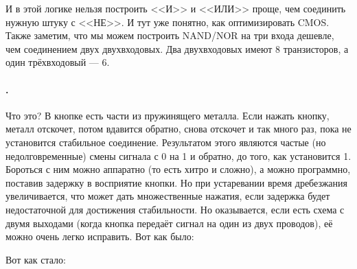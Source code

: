 \documentclass{article}
\begin{document}
    И в этой логике нельзя построить <<И>> и <<ИЛИ>> проще, чем соединить нужную штуку с <<НЕ>>. И тут уже понятно, как оптимизировать CMOS. Также заметим, что мы можем построить NAND/NOR на три входа дешевле, чем соединением двух двухвходовых. Два двухвходовых имеют 8 транзисторов, а один трёхвходовый --- 6.
    \paragraph{.}
    Что это? В кнопке есть части из пружинящего металла. Если нажать кнопку, металл отскочет, потом вдавится обратно, снова отскочет и так много раз, пока не установится стабильное соединение. Результатом этого являются частые (но недолговременные) смены сигнала с 0 на 1 и обратно, до того, как установится 1. Бороться с ним можно аппаратно (то есть хитро и сложно), а можно программно, поставив задержку в восприятие кнопки. Но при устаревании время дребезжания увеличивается, что может дать множественные нажатия, если задержка будет недостаточной для достижения стабильности. Но оказывается, если есть схема с двумя выходами (когда кнопка передаёт сигнал на один из двух проводов), её можно очень легко исправить.
    Вот как было:
    \begin{center}
    \end{center}
    Вот как стало:
    \begin{center}
    \end{center}
\end{document}
